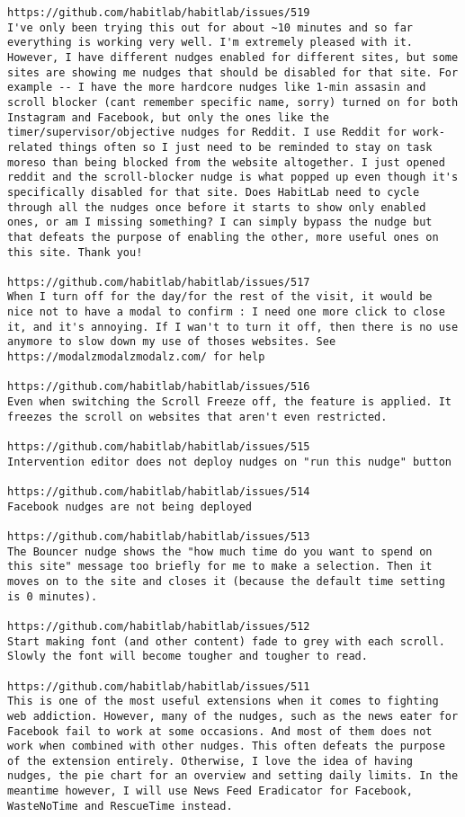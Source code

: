 \begin{lstlisting}[breaklines]
https://github.com/habitlab/habitlab/issues/519
I've only been trying this out for about ~10 minutes and so far everything is working very well. I'm extremely pleased with it. However, I have different nudges enabled for different sites, but some sites are showing me nudges that should be disabled for that site. For example -- I have the more hardcore nudges like 1-min assasin and scroll blocker (cant remember specific name, sorry) turned on for both Instagram and Facebook, but only the ones like the timer/supervisor/objective nudges for Reddit. I use Reddit for work-related things often so I just need to be reminded to stay on task moreso than being blocked from the website altogether. I just opened reddit and the scroll-blocker nudge is what popped up even though it's specifically disabled for that site. Does HabitLab need to cycle through all the nudges once before it starts to show only enabled ones, or am I missing something? I can simply bypass the nudge but that defeats the purpose of enabling the other, more useful ones on this site. Thank you!

https://github.com/habitlab/habitlab/issues/517
When I turn off for the day/for the rest of the visit, it would be nice not to have a modal to confirm : I need one more click to close it, and it's annoying. If I wan't to turn it off, then there is no use anymore to slow down my use of thoses websites. See https://modalzmodalzmodalz.com/ for help

https://github.com/habitlab/habitlab/issues/516
Even when switching the Scroll Freeze off, the feature is applied. It freezes the scroll on websites that aren't even restricted.

https://github.com/habitlab/habitlab/issues/515
Intervention editor does not deploy nudges on "run this nudge" button

https://github.com/habitlab/habitlab/issues/514
Facebook nudges are not being deployed

https://github.com/habitlab/habitlab/issues/513
The Bouncer nudge shows the "how much time do you want to spend on this site" message too briefly for me to make a selection. Then it moves on to the site and closes it (because the default time setting is 0 minutes).

https://github.com/habitlab/habitlab/issues/512
Start making font (and other content) fade to grey with each scroll. Slowly the font will become tougher and tougher to read.

https://github.com/habitlab/habitlab/issues/511
This is one of the most useful extensions when it comes to fighting web addiction. However, many of the nudges, such as the news eater for Facebook fail to work at some occasions. And most of them does not work when combined with other nudges. This often defeats the purpose of the extension entirely. Otherwise, I love the idea of having nudges, the pie chart for an overview and setting daily limits. In the meantime however, I will use News Feed Eradicator for Facebook, WasteNoTime and RescueTime instead.


\end{lstlisting}
